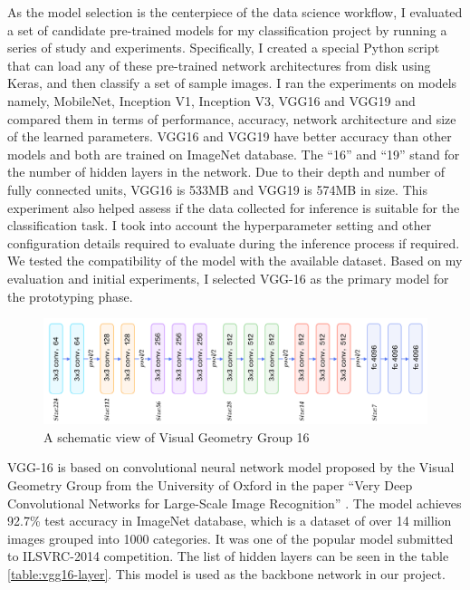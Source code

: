 As the model selection is the centerpiece of the data science workflow, I evaluated a set of candidate pre-trained models for my classification project by running a series of study and experiments. Specifically, I created a special Python script that can load any of these pre-trained network architectures from disk using Keras, and then classify a set of sample images. I ran the experiments on models namely, MobileNet, Inception V1, Inception V3, VGG16 and VGG19 and compared them in terms of performance, accuracy, network architecture and size of the learned parameters. VGG16 and VGG19 have better accuracy than other models and both are trained on ImageNet database. The “16” and “19” stand for the number of hidden layers in the network. Due to their depth and number of fully connected units, VGG16 is 533MB and VGG19 is 574MB in size. This experiment also helped assess if the data collected for inference is suitable for the classification task. I took into account the hyperparameter setting and other configuration details required to evaluate during the inference process if required. We tested the compatibility of the model with the available dataset. Based on my evaluation and initial experiments, I selected VGG-16 as the primary model for the prototyping phase.

\begin{figure}[htbp]
\centering
\includegraphics[width=1\textwidth]{images/cnn-vgg16-1.png}
\caption{A schematic view of Visual Geometry Group 16 \protect\footnotemark}
\label{fig:CNN-1}
\end{figure}

VGG-16 is based on convolutional neural network model proposed by the Visual Geometry Group from the University of Oxford in the paper “Very Deep Convolutional Networks for Large-Scale Image Recognition” \cite{2014arXiv1409.1556S}. The model achieves 92.7\%  test accuracy in ImageNet database, which is a dataset of over 14 million images grouped into 1000 categories. It was one of the popular model submitted to ILSVRC-2014 competition. The list of hidden layers can be seen in the table \ref{table:vgg16-layer}. This model is used as the backbone network in our project.

